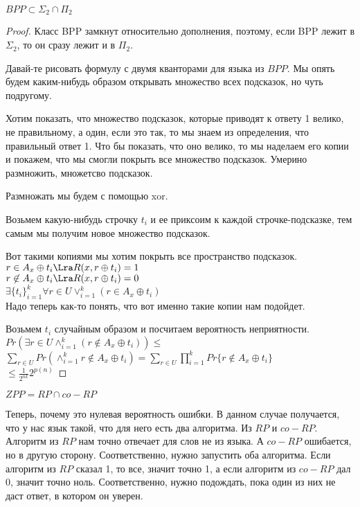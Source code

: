 \begin {theorem}
$BPP \subset \Sigma_2 \cap \Pi_2$\\
\end{theorem}
\begin{proof}
Класс BPP замкнут относительно дополнения, поэтому, если BPP лежит в $\Sigma_2$, 
то он сразу лежит и в $\Pi_2$.

Давай-те рисовать формулу с двумя кванторами для языка из $BPP$. Мы опять будем каким-нибудь образом 
открывать множество всех подсказок, но чуть подругому. 

Хотим показать, что множество подсказок, которые приводят к ответу 1 велико, не правильному, а один, если это так, 
то мы знаем из определения, что правильный ответ 1. Что бы показать, 
что оно велико, то мы наделаем его копии и покажем, что мы смогли покрыть все множество подсказок. Умерино размножить,  множетсво подсказок. 

Размножать мы будем с помощью xor.

Возьмем какую-нибудь строчку $t_i$ и ее приксоим к каждой строчке-подсказке, тем самым
мы получим новое множество подсказок.

Вот такими копиями мы хотим покрыть все пространство подсказок.
$r \in A_x \oplus t_i \Lra R(x, r \oplus t_i) = 1$ \\
$r \not \in A_x \oplus t_i \Lra R(x, r \oplus t_i) = 0$\\

$\exists\{t_i\}_{i = 1}^{k} \forall r \in U \vee_{i = 1}^{k}(r \in A_x \oplus t_i)$ \\

Надо теперь как-то понять, что вот именно такие копии нам подойдет.

Возьмем $t_i$ случайным образом и посчитаем вероятность неприятности.
$Pr(\exists r\in U \wedge_{i = 1}^{k}(r \not \in A_x \oplus t_i)) \le$\\
$\sum_{r \in U}Pr(\wedge_{i = 1}^{k}r \not \in A_x \oplus t_i) = \sum_{r \in U} \prod_{i = 1}^{k}Pr\{r \not \in A_x \oplus t_i\}$\\
$\le \frac{1}{2^{nk}}2^{p(n)}$ 
\end{proof}

\begin{Def}
$ZPP = RP \cap co-RP$ \\
\end{Def}
Теперь, почему это нулевая вероятность ошибки. 
В данном случае получается, что у нас язык такой, что для него есть 
два алгоритма. Из $RP$ и $co-RP$. Алгоритм из $RP$ нам точно отвечает для 
слов не из языка. А $co-RP$ ошибается, но в другую сторону. Соответственно, 
нужно запустить оба алгоритма. Если алгоритм из $RP$ сказал 1, то все, значит точно 
1, а если алгоритм из $co-RP$ дал 0, значит точно ноль. Соответственно, 
нужно подождать, пока один из них не даст ответ, в котором он уверен. 

